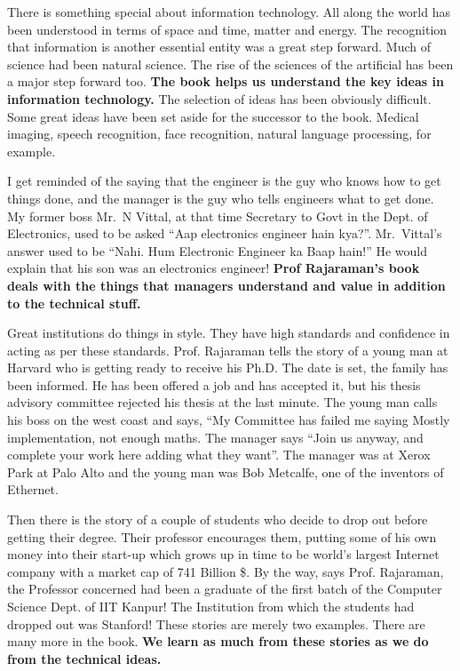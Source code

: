 \begin{multicols}{2}
There is something special about information technology. All along the world has been understood in terms of space and time, matter and energy. The recognition that information is another essential entity was a great step forward. Much of science had been natural science. The rise of the sciences of the artificial has been a major step forward too. \textbf{The book helps us understand the key ideas in information technology.} The selection of ideas has been obviously difficult. Some great ideas have been set aside for the successor to the book. Medical imaging, speech recognition, face recognition, natural language processing, for example. 

I get reminded of the saying that the engineer is the guy who knows how to get things done, and the manager is the guy who tells engineers what to get done. My former boss Mr.~N Vittal, at that time Secretary to Govt in the Dept. of Electronics, used to be asked “Aap electronics engineer hain kya?”. Mr.~Vittal’s answer used to be “Nahi. Hum Electronic Engineer ka Baap hain!” He would explain that his son was an electronics engineer! \textbf{Prof Rajaraman’s book deals with the things that managers understand and value in addition to the technical stuff.}

Great institutions do things in style. They have high standards and confidence in acting as per these standards. Prof. Rajaraman tells the story of a young man at Harvard who is getting ready to receive his Ph.D. The date is set, the family has been informed. He has been offered a job and has accepted it, but his thesis advisory committee rejected his thesis at the last minute. The young man calls his boss on the west coast and says, “My Committee has failed me saying Mostly implementation, not enough maths. The manager says “Join us anyway, and complete your work here adding what they want”. The manager was at Xerox Park at Palo Alto and the young man was Bob Metcalfe, one of the inventors of Ethernet.

Then there is the story of a couple of students who decide to drop out before getting their degree. Their professor encourages them, putting some of his own money into their start-up which grows up in time to be world’s largest Internet company with a market cap of 741 Billion \$. By the way, says Prof. Rajaraman, the Professor concerned had been a graduate of the first batch of the Computer Science Dept. of IIT Kanpur! The Institution from which the students had dropped out was Stanford!  These stories are merely two examples. There are many more in the book. \textbf{We learn as much from these stories as we do from the technical ideas.}


\end{multicols}
